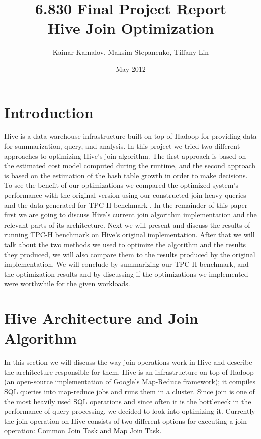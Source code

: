 \documentclass[11pt]{article}
\title{6.830 Final Project Report \\ Hive Join Optimization}
\author{Kainar Kamalov, Maksim Stepanenko, Tiffany Lin}
\date{May 2012}
\begin{document}
\setlength{\baselineskip}{1.3\baselineskip}

\ifpdf
{}
\else
{}
\fi

\maketitle

\section{Introduction}
Hive is a data warehouse infrastructure built on top of Hadoop for providing data for summarization, query, and analysis. In this project we tried two different approaches to optimizing Hive's join algorithm. The first approach is based on the estimated cost model computed during the runtime, and the second approach is based on the estimation of the hash table growth in order to make decisions. To see the benefit of our optimizations we compared the optimized system's performance with the original version using our constructed join-heavy queries and the data generated for TPC-H benchmark \cite{tpc-h}. In the remainder of this paper first we are going to discuss Hive's current join algorithm implementation and the relevant parts of its architecture. Next we will present and discuss the results of running TPC-H benchmark on Hive's original implementation. After that we will talk about the two methods we used to optimize the algorithm and the results they produced, we will also compare them to the results produced by the original implementation. We will conclude by summarizing our TPC-H benchmark, and the optimization results and by discussing if the optimizations we implemented were worthwhile for the given workloads.
\section{Hive Architecture and Join Algorithm}
In this section we will discuss the way join operations work in Hive and describe the architecture responsible for them. Hive is an infrastructure on top of Hadoop (an open-source implementation of Google's Map-Reduce framework); it compiles SQL queries into map-reduce jobs and runs them in a cluster. Since join is one of the most heavily used SQL operations and since often it is the bottleneck in the performance of query processing, we decided to look into optimizing it. Currently the join operation on Hive consists of two different options for executing a join operation: Common Join Task and Map Join Task. 
\end{document}
